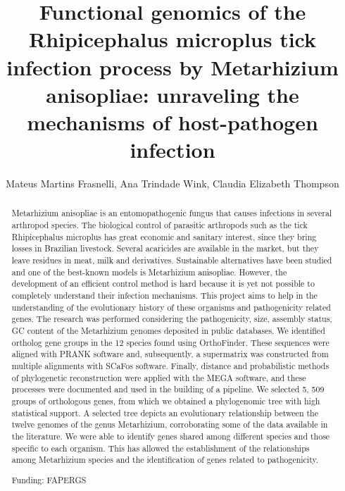 \documentclass[twoside]{article}
\title{\vspace{-15mm}\fontsize{24pt}{10pt}\selectfont\textbf{ Functional genomics of the Rhipicephalus microplus tick infection process by Metarhizium anisopliae: unraveling the mechanisms of host-pathogen infection }} %
\author{ Mateus Martins Frasnelli, Ana Trindade Wink, Claudia Elizabeth Thompson }
\affil{ UFCSPA }
\date{}
\begin{document}
  
  
  \maketitle %
  
  
  \thispagestyle{fancy} %
  
  
  \begin{abstract}
  Metarhizium anisopliae is an entomopathogenic fungus that causes infections in several arthropod species. The biological control of parasitic arthropods such as the tick Rhipicephalus microplus has great economic and sanitary interest,  since they bring losses in Brazilian livestock. Several acaricides are available in the market,  but they leave residues in meat,  milk and derivatives. Sustainable alternatives have been studied and one of the best-known models is Metarhizium anisopliae. However,  the development of an efficient control method is hard because it is yet not possible to completely understand their infection mechanisms. This project aims to help in the understanding of the evolutionary history of these organisms and pathogenicity related genes.
The research was performed considering the pathogenicity,  size,  assembly status,  GC content of the Metarhizium genomes deposited in public databases. We identified ortholog gene groups in the 12 species found using OrthoFinder. These sequences were aligned with PRANK software and,  subsequently,  a supermatrix was constructed from multiple alignments with SCaFos software. Finally,  distance and probabilistic methods of phylogenetic reconstruction were applied with the MEGA software,  and these processes were documented and used in the building of a pipeline.
We selected 5, 509 groups of orthologous genes,  from which we obtained a phylogenomic tree with high statistical support. A selected tree depicts an evolutionary relationship between the twelve genomes of the genus Metarhizium,  corroborating some of the data available in the literature. We were able to identify genes shared among different species and those specific to each organism. This has allowed the establishment of the relationships among Metarhizium species and the identification of genes related to pathogenicity.
  
  Funding: FAPERGS \\ 
  \end{abstract}
  
\end{document}
